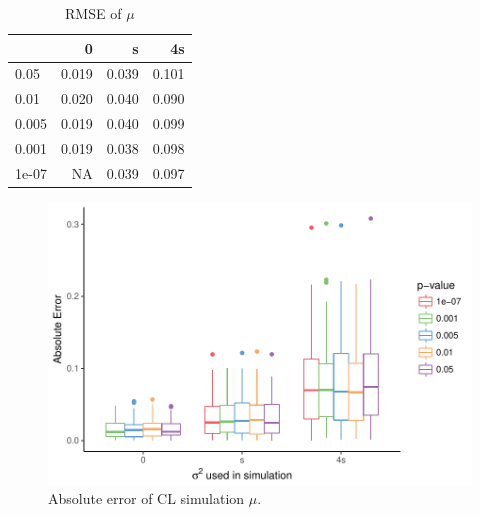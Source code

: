 \documentclass[AMA,STIX1COL]{WileyNJD-v2}\usepackage[]{graphicx}\usepackage[]{color}
\newenvironment{knitrout}{}{} %
\begin{document}
\begin{knitrout}
\color{fgcolor}\begin{table}

\caption{\label{tab:unnamed-chunk-26}RMSE of $\mu$}
\centering
\begin{tabular}[t]{l|r|r|r}
\hline
  & 0 & s & 4s\\
\hline
0.05 & 0.019 & 0.039 & 0.101\\
\hline
0.01 & 0.020 & 0.040 & 0.090\\
\hline
0.005 & 0.019 & 0.040 & 0.099\\
\hline
0.001 & 0.019 & 0.038 & 0.098\\
\hline
1e-07 & NA & 0.039 & 0.097\\
\hline
\end{tabular}
\end{table}


\end{knitrout}



\begin{figure}
\caption{Absolute error of CL simulation $\mu$.}

\begin{knitrout}
\color{fgcolor}

{\centering \includegraphics[width=6in]{figure/unnamed-chunk-27-1} 

}



\end{knitrout}
\end{figure}
\end{document}
